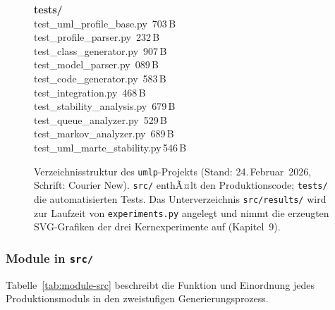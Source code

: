 ﻿\documentclass[a4paper,12pt]{scrreprt}
\theoremstyle{definition}
\begin{document}
\begin{figure}[H]
{\begin{minipage}{0.86\textwidth}
			{\bfseries tests/}\\
			\treemid test\_uml\_profile\_base.py   \,703\,B\\
			\treemid test\_profile\_parser.py      \,232\,B\\
			\treemid test\_class\_generator.py     \,907\,B\\
			\treemid test\_model\_parser.py        \,089\,B\\
			\treemid test\_code\_generator.py      \,583\,B\\
			\treemid test\_integration.py          \,468\,B\\
			\treemid test\_stability\_analysis.py  \,679\,B\\
			\treemid test\_queue\_analyzer.py      \,529\,B\\
			\treemid test\_markov\_analyzer.py     \,689\,B\\
			\treeend test\_uml\_marte\_stability.py\,546\,B\\
			
		\end{minipage}%
	}
	\caption{Verzeichnisstruktur des \texttt{umlp}-Projekts
		(Stand: 24.\,Februar~2026, Schrift: Courier New).
		\texttt{src/} enthÃ¤lt den Produktionscode;
		\texttt{tests/} die automatisierten Tests.
		Das Unterverzeichnis \texttt{src/results/} wird
		zur Laufzeit von \texttt{experiments.py} angelegt
		und nimmt die erzeugten SVG-Grafiken der drei
		Kernexperimente auf (Kapitel~9).}
	\label{fig:projektstruktur}
\end{figure}


\subsubsection{Module in \texttt{src/}}
\label{subsubsec:module-src}

Tabelle~\ref{tab:module-src} beschreibt die Funktion und
Einordnung jedes Produktionsmoduls in den zweistufigen
Generierungsprozess.
\end{document}
